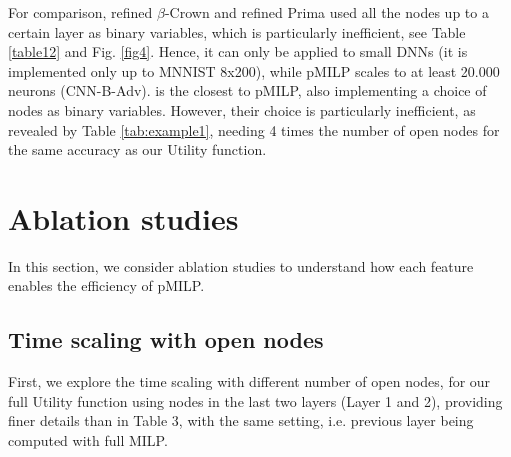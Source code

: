 {For comparison, refined $\beta$-Crown and refined Prima used all the nodes up to a certain layer as binary variables, which is particularly inefficient, see Table \ref{table12} and Fig. \ref{fig4}. Hence, it can only be applied to small DNNs (it is implemented only up to MNNIST 8x200), while pMILP scales to at least 20.000 neurons (CNN-B-Adv).
\cite{DivideAndSlide} is the closest to pMILP, also implementing a choice of nodes as binary variables. However, their choice is particularly inefficient, as revealed by Table  
\ref{tab:example1}, needing 4 times the number of open nodes for the same accuracy as our Utility function.




\section{Ablation studies}	

In this section, we consider ablation studies to understand how each feature enables the efficiency of pMILP.

\subsection*{Time scaling with open nodes}	

First, we explore the time scaling with different number of open nodes, for our full Utility function using nodes in the last two layers (Layer 1 and 2), providing finer details than in Table 3, with the same setting, i.e. previous layer being computed with full MILP.





}
